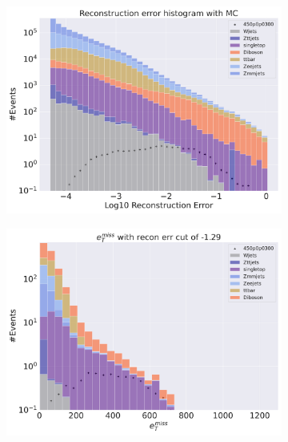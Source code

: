 \begin{figure}[H]
    \centering
    \begin{subfigure}{.40\textwidth}
        \includegraphics[width=\textwidth]{Figures/AE_testing/small/2lep/b_data_recon_big_rm3_feats_sig_450p0p0300_.pdf}
        \caption{ }
        \label{fig:AE_2lep_small_450_2}
    \end{subfigure}
    \hfill
    \begin{subfigure}{.40\textwidth}
        \includegraphics[width=\textwidth]{Figures/AE_testing/small/2lep/b_data_recon_big_rm3_feats_sig_450p0p0300_recon_errcut_-1.29.pdf}
        \caption{}
        \label{fig:AE_2lep_small_etmiss_450_2}
    \end{subfigure}

\end{figure}
